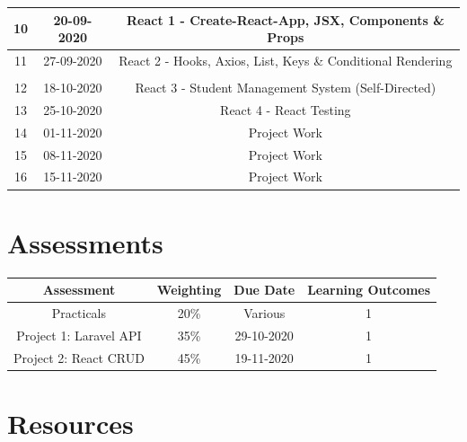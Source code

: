 \documentclass{article}
\begin{document}
\begin{tabular}{|c|c|c|c|}
	\footnotesize 10      & \footnotesize 20-09-2020 & \multicolumn{2}{c|}{\footnotesize React 1 - Create-React-App, JSX, Components \& Props} \\ \hline
	\footnotesize 11     & \footnotesize 27-09-2020 & \multicolumn{2}{c|}{\footnotesize React 2 - Hooks, Axios, List, Keys \& Conditional Rendering} \\ \hline
	\rowcolor{yellow} \multicolumn{4}{|c|}{\footnotesize Mid Term Break}                    \\ \hline
	\footnotesize 12     & \footnotesize 18-10-2020 & \multicolumn{2}{c|}{\footnotesize React 3 - Student Management System (Self-Directed)}     \\ \hline
	\footnotesize 13     & \footnotesize 25-10-2020 & \multicolumn{2}{c|}{\footnotesize React 4 - React Testing}    \\ \hline
	\footnotesize 14     & \footnotesize 01-11-2020 & \multicolumn{2}{c|}{\footnotesize Project Work}     \\ \hline
	\footnotesize 15     & \footnotesize 08-11-2020 & \multicolumn{2}{c|}{\footnotesize Project Work}     \\ \hline
	\footnotesize 16     & \footnotesize 15-11-2020 & \multicolumn{2}{c|}{\footnotesize Project Work}     \\ \hline
\end{tabular}

\section*{Assessments}
\renewcommand{\arraystretch}{1.5}
\begin{tabular}{|c|c|c|c|}
	\hline
	\textbf{Assessment}                                & \textbf{Weighting} & \textbf{Due Date} & \textbf{Learning Outcomes} \\ \hline 
	\small Practicals                       & \small 20\%        & \small Various & \small 1                   \\ \hline
	\small Project 1: Laravel API                       & \small 35\%        & \small 29-10-2020 & \small 1                   \\ \hline
	\small Project 2: React CRUD                       & \small 45\%        & \small 19-11-2020 & \small 1                   \\ \hline 
\end{tabular}

\section*{Resources}
\end{document}
